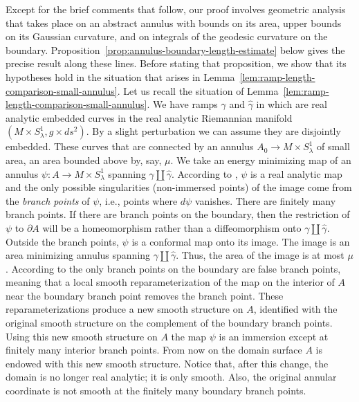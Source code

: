 Except for the brief comments that follow, our proof involves
geometric analysis that takes place on an abstract annulus with
bounds on its area, upper bounds on its Gaussian curvature, and on
integrals of the geodesic curvature on the boundary.
Proposition~\ref{prop:annulus-boundary-length-estimate} below gives the precise result along
these lines. Before stating that proposition, we show that its
hypotheses hold in the situation that arises in Lemma~\ref{lem:ramp-length-comparison-small-annulus}.
Let us recall  the situation of Lemma~\ref{lem:ramp-length-comparison-small-annulus}. We have ramps
$\gamma$ and $\hat \gamma$ in which are real analytic embedded
curves in the real analytic Riemannian manifold $(M\times
S^1_\lambda,g\times ds^2)$. By a slight perturbation we can assume
they are disjointly embedded. These curves that are connected by an
annulus $A_0\to M\times S^1_\lambda$ of small area, an area bounded
above by, say,  $\mu$. We take an energy minimizing map of an
annulus $\psi\colon A\to M\times S^1_\lambda$ spanning
$\gamma\coprod \hat \gamma$. According to \cite{Hildebrandt}, $\psi$
is a real analytic map and the only possible singularities
(non-immersed points) of the image come from the {\em branch points}
of $\psi$, i.e., points where $d\psi$ vanishes. There are finitely
many branch points. If there are branch points on the boundary, then
the restriction of $\psi$ to $\partial A$ will be a homeomorphism
rather than a diffeomorphism onto $\gamma\coprod \hat \gamma$.
Outside the branch points, $\psi$ is a conformal map onto its image.
The image is an area minimizing annulus spanning $\gamma\coprod \hat
\gamma$. Thus, the area of the image is at most $\mu$. According to
\cite{White} the only branch points on the boundary are false branch
points, meaning that a local smooth reparameterization of the map on
the interior of $A$ near the boundary branch point removes the
branch point. These reparameterizations produce a new smooth
structure on $A$, identified with the original smooth structure on
the complement of the boundary branch points. Using this new smooth
structure on $A$ the map $\psi$ is an immersion except at finitely
many interior branch points. From now on the domain surface $A$ is
endowed with this new smooth structure. Notice that, after this
change, the domain is no longer real analytic; it is  only smooth.
Also, the original annular coordinate is not smooth at the finitely
many boundary branch points.


